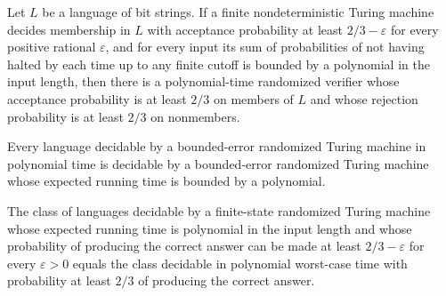 \begin{theorem}
\label{Randomized.inBPP_of_mem_BPP_ExpPTM}
\leanok
{}
Let $L$ be a language of bit strings. If a finite nondeterministic Turing machine
decides membership in $L$ with acceptance probability at least $2/3-\varepsilon$ for
every positive rational $\varepsilon$, and for every input its sum of probabilities of
not having halted by each time up to any finite cutoff is bounded by a polynomial in the
input length, then there is a polynomial-time randomized verifier whose acceptance
probability is at least $2/3$ on members of $L$ and whose rejection probability is at
least $2/3$ on nonmembers.
\end{theorem}

\begin{theorem}
\label{Randomized.BPP_PTM_subset_BPP_ExpPTM}
\leanok
{}
Every language decidable by a bounded-error randomized Turing machine in polynomial time
is decidable by a bounded-error randomized Turing machine whose expected running time is
bounded by a polynomial.
\end{theorem}

\begin{theorem}
\label{Randomized.BPP_ExpPTM_eq_BPP_PTM}
\leanok
{}
The class of languages decidable by a finite-state randomized Turing machine whose
expected running time is polynomial in the input length and whose probability of
producing the correct answer can be made at least $2/3-\varepsilon$ for every
$\varepsilon>0$ equals the class decidable in polynomial worst-case time with
probability at least $2/3$ of producing the correct answer.
\end{theorem}
